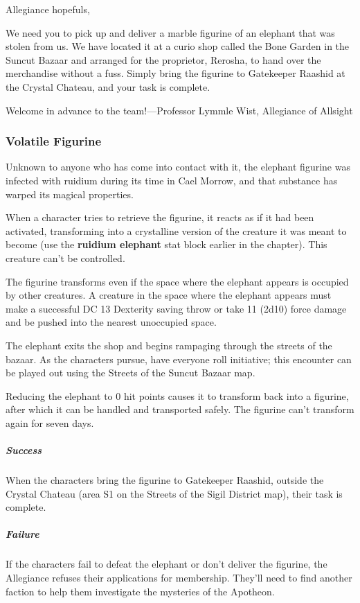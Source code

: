 \documentclass[10pt,a4paper,twoside,bg=print,twocolumn,openany,nodeprecatedcode]{dndbook}
\begin{document}
\begin{DndReadAloud}{}
Allegiance hopefuls,

We need you to pick up and deliver a marble figurine of an elephant that was stolen from us. We have located it at a curio shop called the Bone Garden in the Suncut Bazaar and arranged for the proprietor, Rerosha, to hand over the merchandise without a fuss. Simply bring the figurine to Gatekeeper Raashid at the Crystal Chateau, and your task is complete.

Welcome in advance to the team!—Professor Lymmle Wist, Allegiance of Allsight

\end{DndReadAloud}

\subsubsection{Volatile Figurine}
Unknown to anyone who has come into contact with it, the elephant figurine was infected with ruidium during its time in Cael Morrow, and that substance has warped its magical properties.

When a character tries to retrieve the figurine, it reacts as if it had been activated, transforming into a crystalline version of the creature it was meant to become (use the \textbf{ruidium elephant} stat block earlier in the chapter). This creature can't be controlled.

The figurine transforms even if the space where the elephant appears is occupied by other creatures. A creature in the space where the elephant appears must make a successful DC 13 Dexterity saving throw or take 11 (2d10) force damage and be pushed into the nearest unoccupied space.

The elephant exits the shop and begins rampaging through the streets of the bazaar. As the characters pursue, have everyone roll initiative; this encounter can be played out using the Streets of the Suncut Bazaar map.

Reducing the elephant to 0 hit points causes it to transform back into a figurine, after which it can be handled and transported safely. The figurine can't transform again for seven days.

\subparagraph{Success}
When the characters bring the figurine to Gatekeeper Raashid, outside the Crystal Chateau (area S1 on the Streets of the Sigil District map), their task is complete.

\subparagraph{Failure}
If the characters fail to defeat the elephant or don't deliver the figurine, the Allegiance refuses their applications for membership. They'll need to find another faction to help them investigate the mysteries of the Apotheon.
\end{document}
